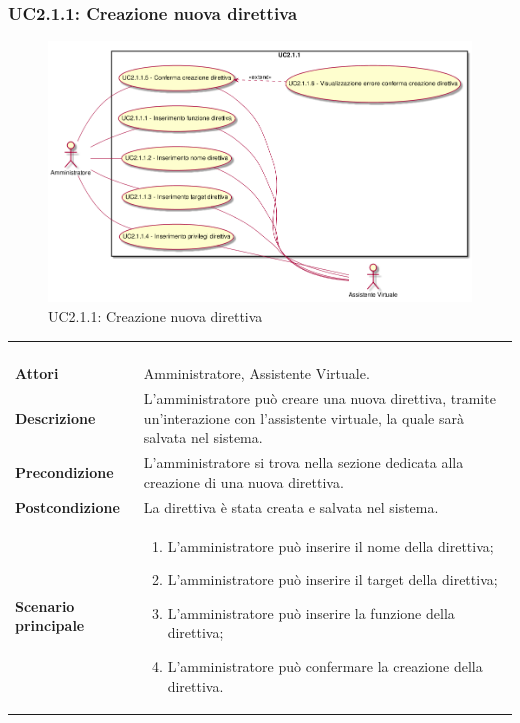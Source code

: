\newpage\subsubsection{UC2.1.1: Creazione nuova direttiva}
\label{UC2.1.1}
\begin{figure}[h]
\centering
\includegraphics[width=\textwidth,height=\textheight,keepaspectratio]{images/UseCaseUC211.png}
\caption{UC2.1.1: Creazione nuova direttiva}
\end{figure}
\begin{longtable}{l|p{10cm}}
\rowcolor[gray]{0.8} \multicolumn{2}{c}{} \\
\rowcolor[gray]{0.8} \multicolumn{2}{c}{\textbf{UC2.1.1 - Creazione nuova direttiva}} \\
\rowcolor[gray]{0.8} \multicolumn{2}{c}{} \\
\hline
&\\
\textbf{Attori} & Amministratore, Assistente Virtuale.\\[7pt]
\textbf{Descrizione} & L'amministratore può creare una nuova direttiva, tramite un'interazione con l'assistente virtuale, la quale sarà salvata nel sistema.\\[7pt]
\textbf{Precondizione} & L'amministratore si trova nella sezione dedicata alla creazione di una nuova direttiva.\\[7pt]
\textbf{Postcondizione} & La direttiva è stata creata e salvata nel sistema.\\[7pt]
\textbf{Scenario principale} &\begin{enumerate}
\item  L'amministratore può inserire il nome della direttiva;
\item  L'amministratore può inserire il target della direttiva;
\item  L'amministratore può inserire la funzione della direttiva;
\item  L'amministratore può confermare la creazione della direttiva.
\end{enumerate}
\\[7pt]\hline
\end{longtable}

